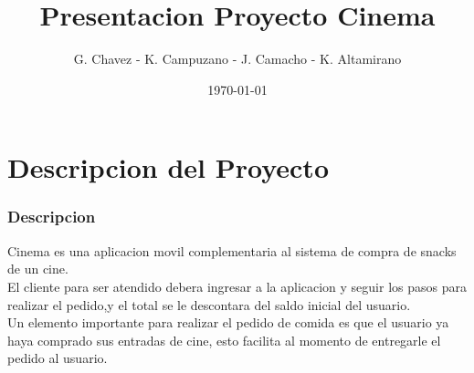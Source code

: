 \documentclass{beamer}
\title{Presentacion Proyecto Cinema}
\author{G. Chavez - K. Campuzano - J. Camacho - K. Altamirano}
\date{\today}
\begin{document}
\frame{\titlepage}

\section[Indice]{}
\begin{frame}[allowframebreaks]
\tableofcontents
\end{frame}

\section{Descripcion del Proyecto}
\begin{frame}[allowframebreaks]
\frametitle{Descripcion}
Cinema es una aplicacion movil complementaria al sistema de compra de snacks de un cine.\\

El cliente para ser atendido debera ingresar a la aplicacion y seguir los pasos para realizar el pedido,y el total se le descontara del saldo inicial del usuario.\\

Un elemento importante para realizar el pedido de comida es que el usuario ya haya comprado
sus entradas de cine, esto facilita al momento de entregarle el pedido al usuario.\\

\end{frame}
\end{document}
